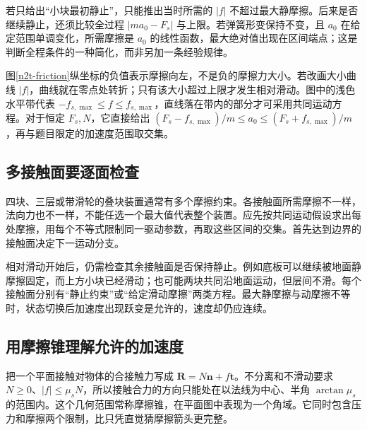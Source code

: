 若只给出“小块最初静止”，只能推出当时所需的 $|f|$ 不超过最大静摩擦。后来是否继续静止，还须比较全过程 $|ma_0-F_s|$ 与上限。若弹簧形变保持不变，且 $a_0$ 在给定范围单调变化，所需摩擦是 $a_0$ 的线性函数，最大绝对值出现在区间端点；这是判断全程条件的一种简化，而非另加一条经验规律。

图\ref{n2t-friction}纵坐标的负值表示摩擦向左，不是负的摩擦力大小。若改画大小曲线 $|f|$，曲线就在零点处转折；只有该大小超过上限才发生相对滑动。图中的浅色水平带代表 $-f_{s,\max}\le f\le f_{s,\max}$，直线落在带内的部分才可采用共同运动方程。对于恒定 $F_s,N$，它直接给出 $(F_s-f_{s,\max})/m\le a_0\le(F_s+f_{s,\max})/m$，再与题目限定的加速度范围取交集。

\subsection{多接触面要逐面检查}
四块、三层或带滑轮的叠块装置通常有多个摩擦约束。各接触面所需摩擦不一样，法向力也不一样，不能任选一个最大值代表整个装置。应先按共同运动假设求出每处摩擦，用每个不等式限制同一驱动参数，再取这些区间的交集。首先达到边界的接触面决定下一运动分支。

相对滑动开始后，仍需检查其余接触面是否保持静止。例如底板可以继续被地面静摩擦固定，而上方小块已经滑动；也可能两块共同沿地面运动，但层间不滑。每个接触面分别有“静止约束”或“给定滑动摩擦”两类方程。最大静摩擦与动摩擦不等时，状态切换后加速度出现跃变是允许的，速度却仍应连续。

\subsection{用摩擦锥理解允许的加速度}
把一个平面接触对物体的合接触力写成 $\bm R=N\bm n+f\bm t$。不分离和不滑动要求 $N\ge0$、$|f|\le\mu_sN$，所以接触合力的方向只能处在以法线为中心、半角 $\arctan\mu_s$ 的范围内。这个几何范围常称摩擦锥，在平面图中表现为一个角域。它同时包含压力和摩擦两个限制，比只凭直觉猜摩擦箭头更完整。

